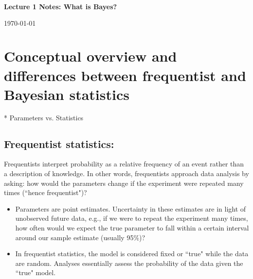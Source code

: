 \documentclass[12pt]{article}
\begin{document}

\begin{center}
  \LARGE{\textbf{Lecture 1 Notes: What is Bayes?}}
  
  \Large{\today{}}
\end{center}
\section{Conceptual overview and differences between frequentist and Bayesian statistics}

  * Parameters vs. Statistics

\subsection*{Frequentist statistics:}
Frequentists interpret probability as a relative frequency of an event rather than a description of knowledge. In other words, frequentists approach data analysis by asking: how would the parameters change if the experiment were repeated many times (``hence frequentist")?

\begin{itemize}  
  \item Parameters are point estimates. Uncertainty in these estimates are in light of unobserved future data, e.g., if we were to repeat the experiment many times, how often would we expect the true parameter to fall within a certain interval around our sample estimate (usually 95\%)? 
  
  \item In frequentist statistics, the model is considered fixed or ``true" while the data are random. Analyses essentially assess the probability of the data given the ``true" model. 
\end{itemize}
\end{document}
